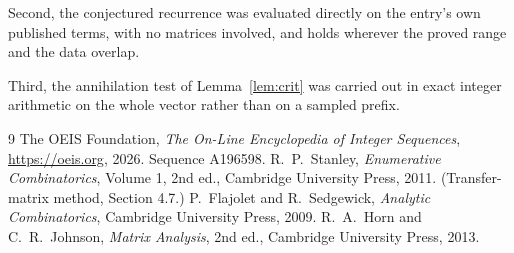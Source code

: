 \documentclass[11pt,a4paper]{article}
\theoremstyle{plain}
\theoremstyle{definition}
\begin{document}
Second, the conjectured recurrence was evaluated directly on the entry's own published terms,
with no matrices involved, and holds wherever the proved range and the data overlap.

Third, the annihilation test of Lemma~\ref{lem:crit} was carried out in exact integer
arithmetic on the whole vector rather than on a sampled prefix.

\begin{thebibliography}{9}
 The OEIS Foundation, \emph{The On-Line Encyclopedia of Integer
Sequences}, \url{https://oeis.org}, 2026. Sequence A196598.
 R.~P.~Stanley, \emph{Enumerative Combinatorics}, Volume 1, 2nd ed.,
Cambridge University Press, 2011. (Transfer-matrix method, Section 4.7.)
 P.~Flajolet and R.~Sedgewick, \emph{Analytic Combinatorics}, Cambridge
University Press, 2009.
 R.~A.~Horn and C.~R.~Johnson, \emph{Matrix Analysis}, 2nd ed., Cambridge
University Press, 2013.
\end{thebibliography}
\end{document}
